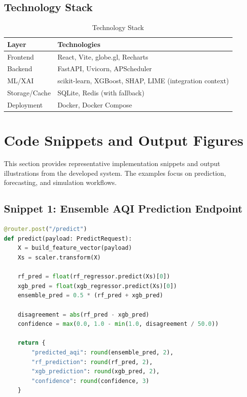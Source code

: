 \documentclass[12pt,a4paper]{article}
\begin{document}
\subsection{Technology Stack}
\begin{table}[H]
\centering
\caption{Technology Stack}
\begin{tabular}{ll}
\toprule
\textbf{Layer} & \textbf{Technologies} \\
\midrule
Frontend & React, Vite, globe.gl, Recharts \\
Backend & FastAPI, Uvicorn, APScheduler \\
ML/XAI & scikit-learn, XGBoost, SHAP, LIME (integration context) \\
Storage/Cache & SQLite, Redis (with fallback) \\
Deployment & Docker, Docker Compose \\
\bottomrule
\end{tabular}
\end{table}

\section{Code Snippets and Output Figures}
This section provides representative implementation snippets and output illustrations from the developed system. The examples focus on prediction, forecasting, and simulation workflows.

\subsection{Snippet 1: Ensemble AQI Prediction Endpoint}
\begin{lstlisting}[style=papercode,language=Python,caption={FastAPI endpoint skeleton for AQI prediction}]
@router.post("/predict")
def predict(payload: PredictRequest):
    X = build_feature_vector(payload)
    Xs = scaler.transform(X)

    rf_pred = float(rf_regressor.predict(Xs)[0])
    xgb_pred = float(xgb_regressor.predict(Xs)[0])
    ensemble_pred = 0.5 * (rf_pred + xgb_pred)

    disagreement = abs(rf_pred - xgb_pred)
    confidence = max(0.0, 1.0 - min(1.0, disagreement / 50.0))

    return {
        "predicted_aqi": round(ensemble_pred, 2),
        "rf_prediction": round(rf_pred, 2),
        "xgb_prediction": round(xgb_pred, 2),
        "confidence": round(confidence, 3)
    }
\end{lstlisting}
\end{document}
